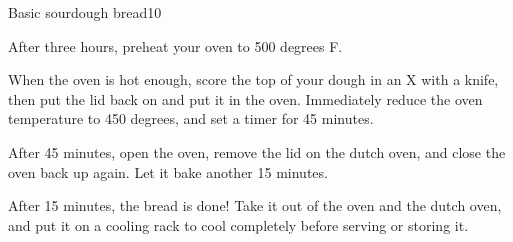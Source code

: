 \documentclass{article}
\begin{document}
\begin{recipe}{Basic sourdough bread}{10}
    \begin{step}
      \begin{ingrs}
      \end{ingrs}
      \begin{stepdesc}
        After three hours, preheat your oven to 500 degrees F.
      \end{stepdesc}
    \end{step}
    \begin{step}
      \begin{ingrs}
      \end{ingrs}
      \begin{stepdesc}
        When the oven is hot enough, score the top of your dough in an X with a knife, then put the lid back on and put it in the oven. Immediately reduce the oven temperature to 450 degrees, and set a timer for 45 minutes.
      \end{stepdesc}
    \end{step}
    \begin{step}
      \begin{ingrs}
      \end{ingrs}
      \begin{stepdesc}
        After 45 minutes, open the oven, remove the lid on the dutch oven, and close the oven back up again. Let it bake another 15 minutes.
      \end{stepdesc}
    \end{step}
    \begin{step}
      \begin{ingrs}
      \end{ingrs}
      \begin{stepdesc}
        After 15 minutes, the bread is done! Take it out of the oven and the dutch oven, and put it on a cooling rack to cool completely before serving or storing it.
      \end{stepdesc}
    \end{step}
  \end{recipe}
\end{document}
